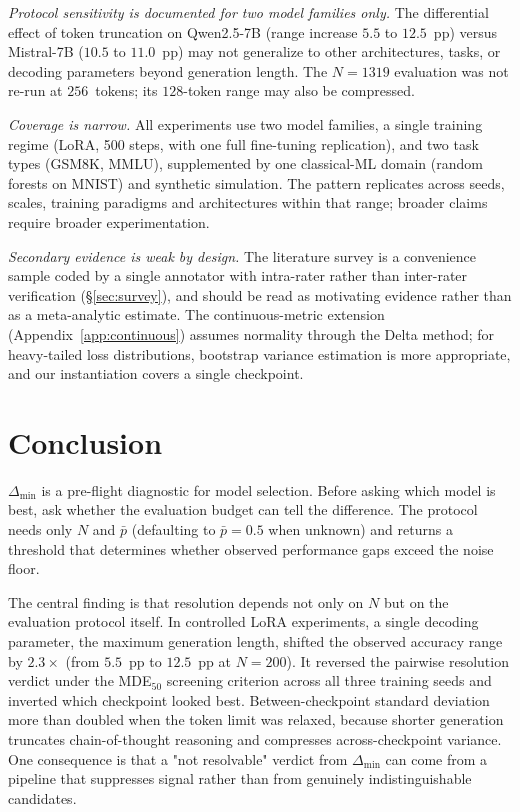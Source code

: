 \documentclass[pdflatex,sn-mathphys-ay,oneside]{sn-jnl}
\theoremstyle{thmstylethree}
\begin{document}
\emph{Protocol sensitivity is documented for two model families only.} The differential effect of token truncation on Qwen2.5-7B (range increase $5.5$ to $12.5$~pp) versus Mistral-7B ($10.5$ to $11.0$~pp) may not generalize to other architectures, tasks, or decoding parameters beyond generation length. The $N=1319$ evaluation was not re-run at $256$~tokens; its $128$-token range may also be compressed.

\emph{Coverage is narrow.} All experiments use two model families, a single training regime (LoRA, 500 steps, with one full fine-tuning replication), and two task types (GSM8K, MMLU), supplemented by one classical-ML domain (random forests on MNIST) and synthetic simulation. The pattern replicates across seeds, scales, training paradigms and architectures within that range; broader claims require broader experimentation.

\emph{Secondary evidence is weak by design.} The literature survey is a convenience sample coded by a single annotator with intra-rater rather than inter-rater verification (\S\ref{sec:survey}), and should be read as motivating evidence rather than as a meta-analytic estimate. The continuous-metric extension (Appendix~\ref{app:continuous}) assumes normality through the Delta method; for heavy-tailed loss distributions, bootstrap variance estimation is more appropriate, and our instantiation covers a single checkpoint.

\section{Conclusion}\label{sec:conclusion}

$\Delta_{\min}$ is a pre-flight diagnostic for model selection. Before asking which model is best, ask whether the evaluation budget can tell the difference. The protocol needs only $N$ and $\bar{p}$ (defaulting to $\bar{p}=0.5$ when unknown) and returns a threshold that determines whether observed performance gaps exceed the noise floor.

The central finding is that resolution depends not only on $N$ but on the evaluation protocol itself. In controlled LoRA experiments, a single decoding parameter, the maximum generation length, shifted the observed accuracy range by $2.3\times$ (from $5.5$~pp to $12.5$~pp at $N=200$). It reversed the pairwise resolution verdict under the MDE$_{50}$ screening criterion across all three training seeds and inverted which checkpoint looked best. Between-checkpoint standard deviation more than doubled when the token limit was relaxed, because shorter generation truncates chain-of-thought reasoning and compresses across-checkpoint variance. One consequence is that a "not resolvable" verdict from $\Delta_{\min}$ can come from a pipeline that suppresses signal rather than from genuinely indistinguishable candidates.
\end{document}
